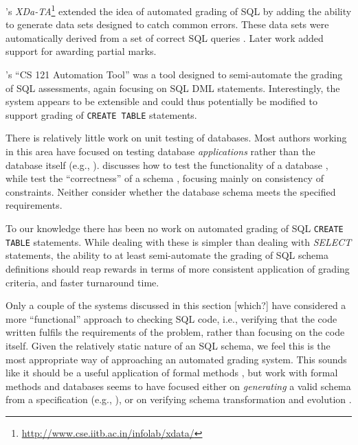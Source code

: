 \documentclass[sigconf, authordraft]{acmart}
\begin{document}
\citeauthor{Bhangdiya.A-2015a-XDa-TA}'s \emph{XDa-TA}\footnote{\url{http://www.cse.iitb.ac.in/infolab/xdata/}} extended the idea of automated grading of SQL by adding the ability to generate data sets designed to catch common errors. These data sets were automatically derived from a set of correct SQL queries \cite{Bhangdiya.A-2015a-XDa-TA,Chandra.B-2015a-Data}. Later work \cite{Chandra.B-2016a-Partial} added support for awarding partial marks.

\citeauthor{Gong.A-2015a-CS-121-Automation}'s ``CS 121 Automation Tool'' \cite{Gong.A-2015a-CS-121-Automation} was a tool designed to semi-automate the grading of SQL assessments, again focusing on SQL DML statements. Interestingly, the system appears to be extensible and could thus potentially be modified to support grading of \texttt{CREATE TABLE} statements.

There is relatively little work on unit testing of databases. Most authors working in this area have focused on testing database \emph{applications} rather than the database itself (e.g., \cite{Binnig.C-2008a-Multi-RQP,Chays.D-2008a-Query-based,Marcozzi.M-2012a-Test,Haller.K-2010a-Test}). \citeauthor{Ambler.S-2006a-Database} discusses how to test the functionality of a database \cite{Ambler.S-2006a-Database}, while \citeauthor{Farre.C-2008a-SVTe} test the ``correctness'' of a schema \cite{Farre.C-2008a-SVTe}, focusing mainly on consistency of constraints. Neither consider whether the database schema meets the specified requirements.

To our knowledge there has been no work on automated grading of SQL \texttt{CREATE TABLE} statements. While dealing with these is simpler than dealing with \emph{SELECT} statements, the ability to at least semi-automate the grading of SQL schema definitions should reap rewards in terms of more consistent application of grading criteria, and faster turnaround time.

Only a couple of the systems discussed in this section [which?] have considered a more ``functional'' approach to checking SQL code, i.e., verifying that the code written fulfils the requirements of the problem, rather than focusing on the code itself. Given the relatively static nature of an SQL schema, we feel this is the most appropriate way of approaching an automated grading system. This sounds like it should be a useful application of formal methods \cite{Spivey.J-1989a-An-introduction}, but work with formal methods and databases seems to have focused either on \emph{generating} a valid schema from a specification (e.g., \cite{Vatanawood.W-2004a-Formal,Lukovic.I-2003a-Proceedings,Choppella.V-2006a-Constructing}), or on verifying schema transformation and evolution \cite{Bench-Capon.T-1998a-Report}.
\end{document}
